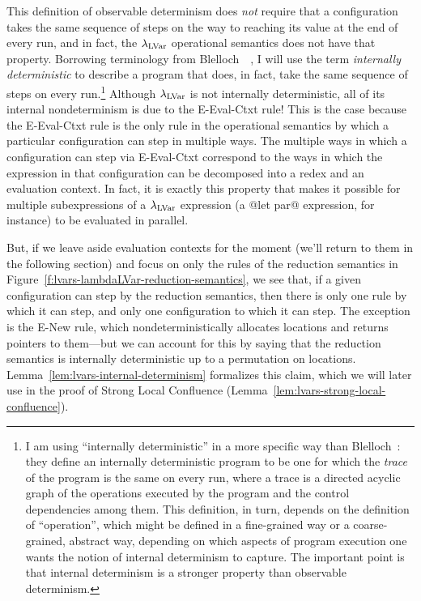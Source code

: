 This definition of observable determinism does \emph{not} require that
a configuration takes the same sequence of steps on the way to
reaching its value at the end of every run, and in fact, the
$\lambda_{\textrm{LVar}}$ operational semantics does not have that property.
Borrowing terminology from
Blelloch~\etal~\cite{blelloch-internally-deterministic}, I will use
the term \emph{internally deterministic} to describe a program that
does, in fact, take the same sequence of steps on every
run.\footnote{I am using ``internally deterministic'' in a more
  specific way than Blelloch~\etal: they define an internally
  deterministic program to be one for which the \emph{trace} of the
  program is the same on every run, where a trace is a directed
  acyclic graph of the operations executed by the program and the
  control dependencies among them.  This definition, in turn, depends
  on the definition of ``operation'', which might be defined in a
  fine-grained way or a coarse-grained, abstract way, depending on
  which aspects of program execution one wants the notion of internal
  determinism to capture.  The important point is that internal
  determinism is a stronger property than observable determinism.}
Although $\lambda_{\textrm{LVar}}$ is not internally deterministic, all of its
internal nondeterminism is due to the {\sc E-Eval-Ctxt} rule!  This is
the case because the {\sc E-Eval-Ctxt} rule is the only rule in the
operational semantics by which a particular configuration can step in
multiple ways.  The multiple ways in which a configuration can step
via {\sc E-Eval-Ctxt} correspond to the ways in which the expression
in that configuration can be decomposed into a redex and an evaluation
context.  In fact, it is exactly this property that makes it possible
for multiple subexpressions of a $\lambda_{\textrm{LVar}}$ expression (a @let par@
expression, for instance) to be evaluated in parallel.

But, if we leave aside evaluation contexts for the moment (we'll
return to them in the following section) and focus on only the rules
of the reduction semantics in
Figure~\ref{f:lvars-lambdaLVar-reduction-semantics}, we see that, if a
given configuration can step by the reduction semantics, then there is
only one rule by which it can step, and only one configuration to
which it can step.  The exception is the {\sc E-New} rule, which
nondeterministically allocates locations and returns pointers to
them---but we can account for this by saying that the reduction
semantics is internally deterministic up to a permutation on
locations.  Lemma~\ref{lem:lvars-internal-determinism} formalizes this
claim, which we will later use in the proof of Strong Local Confluence
(Lemma~\ref{lem:lvars-strong-local-confluence}).

